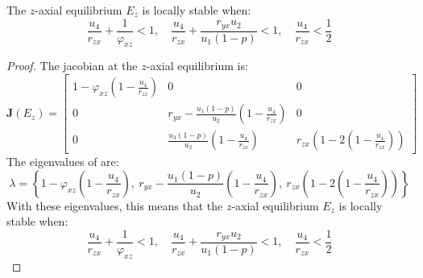 \begin{theorem}\label{thm:eq-axial-z-stability}
    The $z$-axial equilibrium $E_z$ is locally stable when:
    \begin{equation*}
        \frac{u_4}{r_{zx}}+\frac{1}{\varphi_{xz}} < 1,\quad
        \frac{u_4}{r_{zx}}+\frac{r_{yx}u_2}{u_1\left(1-p\right)} < 1,\quad
        \frac{u_4}{r_{zx}} < \frac{1}{2}
    \end{equation*}
\end{theorem}
\begin{proof}
    The jacobian at the $z$-axial equilibrium is:
    \begin{equation}\label{matrix:jacobian-axial-z}
        \textbf{J}\left(E_z\right) = \begin{bmatrix}
            1-\varphi_{xz}\left(1-\frac{u_4}{r_{zx}}\right) & 0 & 0\\
            0 & r_{yx}-\frac{u_1\left(1-p\right)}{u_2}\left(1-\frac{u_4}{r_{zx}}\right) & 0\\
            0 & \frac{u_3\left(1-p\right)}{u_2}\left(1-\frac{u_4}{r_{zx}}\right) & r_{zx}\left(1-2\left(1-\frac{u_4}{r_{zx}}\right)\right)
        \end{bmatrix}
    \end{equation}
    The eigenvalues of  are:
    \begin{equation*}
        \lambda=\left\{1-\varphi_{xz}\left(1-\frac{u_4}{r_{zx}}\right),\ r_{yx}-\frac{u_1\left(1-p\right)}{u_2}\left(1-\frac{u_4}{r_{zx}}\right),\ r_{zx}\left(1-2\left(1-\frac{u_4}{r_{zx}}\right)\right)\right\}
    \end{equation*}
    With these eigenvalues, this means that the $z$-axial equilibrium $E_z$ is locally stable when:
    \begin{equation*}
        \frac{u_4}{r_{zx}}+\frac{1}{\varphi_{xz}} < 1,\quad \frac{u_4}{r_{zx}}+\frac{r_{yx}u_2}{u_1\left(1-p\right)}<1,\quad \frac{u_4}{r_{zx}}<\frac{1}{2}
    \end{equation*}
\end{proof}

